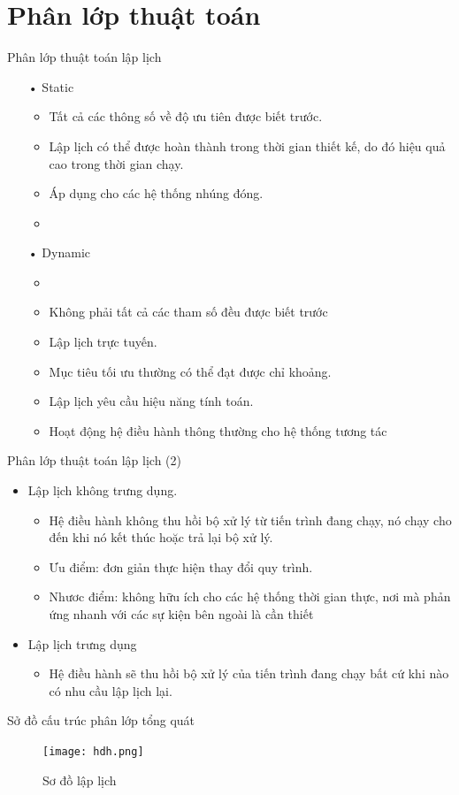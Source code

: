 \documentclass{beamer}
\newcommand{\bi}{\begin{itemize}}
\newcommand{\ei}{\end{itemize}}
\begin{document}
\section{Phân lớp thuật toán}
\begin{frame}{Phân lớp thuật toán lập lịch}
\begin{itemize}
\item[•]Static
\bi
\item Tất cả các thông số về độ ưu tiên được biết trước.
\item Lập lịch có thể được hoàn thành trong thời gian thiết kế, do đó hiệu quả cao trong thời gian chạy.
\item Áp dụng cho các hệ thống nhúng đóng.
\item 
\ei
\item[•] Dynamic
\bi
\item 
\item Không phải tất cả các tham số đều được biết trước
\item Lập lịch trực tuyến.
\item Mục tiêu tối ưu thường có thể đạt được chỉ khoảng.
\item Lập lịch yêu cầu hiệu năng tính toán.
\item Hoạt động hệ điều hành thông thường cho hệ thống tương tác
\ei 
\end{itemize}
\end{frame}
\begin{frame}{Phân lớp thuật toán lập lịch (2)}
\begin{itemize}
\item Lập lịch không trưng dụng.
\bi
\item Hệ điều hành không thu hồi bộ xử lý từ tiến trình đang chạy, nó chạy cho đến khi nó kết thúc hoặc trả lại bộ xử lý.
\item Ưu điểm: đơn giản thực hiện thay đổi quy trình.
\item Nhươc điểm: không hữu ích cho các hệ thống thời gian thực, nơi mà phản ứng nhanh với các sự kiện bên ngoài là cần thiết
\ei
\item Lập lịch trưng dụng
\bi
\item Hệ điều hành sẽ thu hồi bộ xử lý của tiến trình đang chạy bất cứ khi nào có nhu cầu lập lịch lại.
\ei
\end{itemize}
\end{frame}
\begin{frame}{Sở đồ cấu trúc phân lớp tổng quát}
\begin{figure}[h]
\begin{center}
\texttt{[image: hdh.png]}
\caption{Sơ đồ lập lịch}
\end{center}
\end{figure}
\end{frame}
\end{document}
